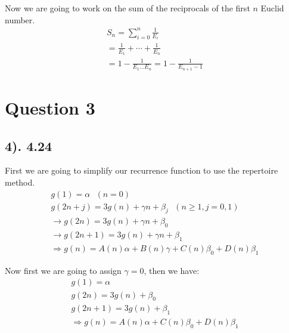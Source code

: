 \documentclass[12pt]{article}
\begin{document}
Now we are going to work on the sum of the reciprocals of the first $n$ Euclid number.
\begin{gather*}
    S_{n} = \sum_{i=0}^n \frac{1}{E_{i}} \\
    = \frac{1}{E_{1}} + \cdots + \frac{1}{E_{n}} \\
    = 1 - \frac{1}{E_{1} \ldots E_{n}} = 1 - \frac{1}{E_{n+1} - 1}
\end{gather*}

\section*{Question 3}
\subsection*{4). 4.24}
First we are going to simplify our recurrence function to use the repertoire method.
\begin{gather*}
    g(1) = \alpha \text{ $(n=0)$} \\
    g(2n+j) = 3g(n) + \gamma n + \beta_{j} \text{ $(n \geq 1, j=0,1)$} \\
    \to g(2n) = 3g(n) + \gamma n + \beta_{0} \\
    \to g(2n+1) = 3g(n) + \gamma n + \beta_{1} \\
    \Rightarrow g(n) = A(n) \alpha + B(n) \gamma + C(n) \beta_{0} + D(n) \beta_{1}
\end{gather*}

Now first we are going to assign $\gamma = 0$, then we have:
\begin{gather*}
    g(1) = \alpha \\
    g(2n) = 3g(n) + \beta_{0} \\
    g(2n+1) = 3g(n) + \beta_{1} \\
    \Rightarrow g(n) = A(n) \alpha + C(n) \beta_{0} + D(n) \beta_{1}
\end{gather*}
\end{document}
